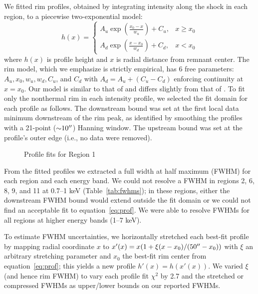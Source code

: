 \documentclass[iop, apj, numberedappendix, twocolappendix]{emulateapj}
\newcommand*{\abt}{\mathord{\sim}} %
\begin{document}
We fitted rim profiles, obtained by integrating intensity along the shock in
each region, to a piecewise two-exponential model:
\begin{equation} \label{eq:prof}
    h(x) =
    \begin{cases}
        A_u \exp \left(\frac{x_0 - x}{w_u}\right) + C_u, &x \geq x_0 \\
        A_d \exp \left(\frac{x - x_0}{w_d}\right) + C_d, &x < x_0
    \end{cases}
\end{equation}
where $h(x)$ is profile height and $x$ is radial distance from remnant center.
The rim model, which we emphasize is strictly empirical, has 6 free parameters:
$A_u, x_0, w_u, w_d, C_u$, and $C_d$ with $A_d = A_u + (C_u - C_d)$ enforcing
continuity at $x=x_0$. Our model is similar to that of \citet{bamba2003,
bamba2005-hist} and differs slightly from that of .
To fit only the nonthermal rim in each intensity profile, we selected the fit
domain for each profile as follows.  The downstream bound was set at the first
local data minimum downstream of the rim peak, as identified by smoothing the
profiles with a 21-point ($\abt 10\arcsec$) Hanning window.  The upstream bound
was set at the profile's outer edge (i.e., no data were removed).

\begin{figure*}[ht]
    \caption{Profile fits for Region 1}
    \label{fig:profiles}
\end{figure*}

From the fitted profiles we extracted a full width at half maximum (FWHM) for
each region and each energy band.  We could not resolve a FWHM in regions 2, 6,
8, 9, and 11 at 0.7--1 keV (Table~\ref{tab:fwhms}); in these regions, either
the downstream FWHM bound would extend outside the fit domain or we could not
find an acceptable fit to equation~\eqref{eq:prof}.  We were able to resolve
FWHMs for all regions at higher energy bands (1--7 keV).

To estimate FWHM uncertainties, we horizontally stretched each best-fit
profile by mapping radial coordinate $x$ to
$x'(x) = x (1 + \xi (x-x_0)/(50\mbox{$^{\prime\prime}$}-x_0))$ with $\xi$ an arbitrary stretching
parameter and $x_0$ the best-fit rim center from equation~\eqref{eq:prof};
this yields a new profile $h'(x) = h(x'(x))$.
We varied $\xi$ (and hence rim FWHM) to vary each profile fit $\chi^2$ by 2.7
and the stretched or compressed FWHMs as upper/lower bounds on our reported
FWHMs.
\end{document}
